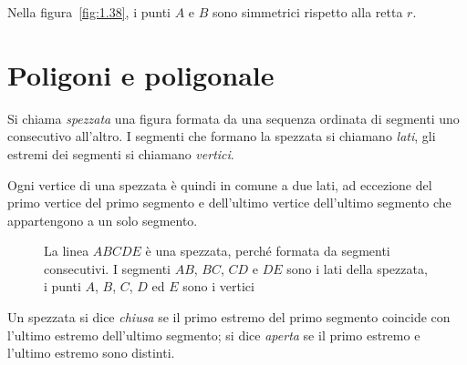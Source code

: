 Nella figura~\ref{fig:1.38}, i punti \(A\) e \(B\) sono simmetrici 
rispetto alla retta \(r\).

\vspazio\ovalbox{\risolvii \ref{ese:1.66}, \ref{ese:1.67}, 
\ref{ese:1.68}, \ref{ese:1.69}, \ref{ese:1.70}, \ref{ese:1.71}, 
\ref{ese:1.72}, \ref{ese:1.73}, \ref{ese:1.74}, \ref{ese:1.75}, 
\ref{ese:1.76}, \ref{ese:1.77}, \ref{ese:1.78},}

\ovalbox{\ref{ese:1.79}, \ref{ese:1.80}, \ref{ese:1.81}, 
\ref{ese:1.82}, \ref{ese:1.83}, \ref{ese:1.84}, \ref{ese:1.85}, 
\ref{ese:1.86}, \ref{ese:1.87}, \ref{ese:1.88}, \ref{ese:1.89}, 
\ref{ese:1.90}, \ref{ese:1.91}, \ref{ese:1.92},\ref{ese:1.93}, 
\ref{ese:1.94}, \ref{ese:1.95},}

\ovalbox{\ref{ese:1.96}, \ref{ese:1.97}, \ref{ese:1.98}, 
\ref{ese:1.99}, \ref{ese:1.100}, \ref{ese:1.101}, \ref{ese:1.102}, 
\ref{ese:1.103}}




\section{Poligoni e poligonale}\label{sect:poligoni}

\begin{definizione}
Si chiama \emph{spezzata} una figura formata da una sequenza ordinata 
di segmenti uno consecutivo all'altro. I segmenti che formano la 
spezzata si chiamano \emph{lati}, gli estremi dei segmenti si 
chiamano \emph{vertici}.
\end{definizione}

Ogni vertice di una spezzata è quindi in comune a due lati, ad 
eccezione del primo vertice del primo segmento e dell'ultimo vertice 
dell'ultimo segmento che appartengono a un solo segmento.


\begin{inaccessibleblock}
 \begin{figure}[htb]
\centering
\caption{La linea \(ABCDE\) è una spezzata, perché formata da segmenti 
consecutivi. I segmenti \(AB\), \(BC\), \(CD\) e \(DE\) sono i lati della 
spezzata, i punti \(A\), \(B\), \(C\), \(D\) ed \(E\) sono i vertici}
\end{figure}
\end{inaccessibleblock}

\begin{definizione}
Un spezzata si dice \emph{chiusa} se il primo estremo del primo 
segmento coincide con l'ultimo estremo dell'ultimo segmento; si dice 
\emph{aperta} se il primo estremo e l'ultimo estremo sono distinti.
\end{definizione}

